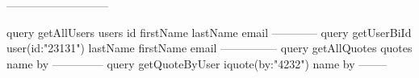 ---------------------------

query getAllUsers{
  users{
    id
    firstName
    lastName
    email 
  }
}
------------
query getUserBiId{
  user(id:"23131"){
    lastName
    firstName
    email
  }
}
---------------
query getAllQuotes{
  quotes{
    name
    by
  }
}
--------------
query getQuoteByUser{
  iquote(by:"4232"){
    name
    by
  }
}
--------